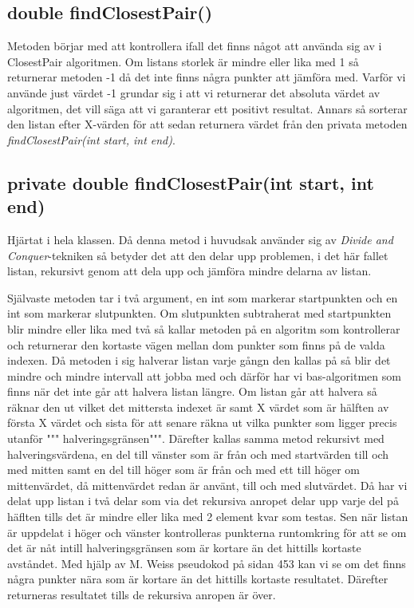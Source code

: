 \documentclass[a5paper,10pt,oneside]{article}
\begin{document}
\subsection{double findClosestPair()} 
Metoden börjar med att kontrollera ifall det finns något att använda sig av i ClosestPair algoritmen. Om listans storlek är mindre eller lika med 1 så returnerar metoden -1 då det inte finns några punkter att jämföra med. Varför vi använde just värdet -1 grundar sig i att vi returnerar det absoluta värdet av algoritmen, det vill säga att vi garanterar ett positivt resultat. Annars så sorterar den listan efter X-värden för att sedan returnera värdet från den privata metoden \textit{findClosestPair(int start, int end)}.

\subsection{private double findClosestPair(int start, int end)} 
Hjärtat i hela klassen.
Då denna metod i huvudsak använder sig av \textit{Divide and Conquer}-tekniken så betyder det att den delar upp problemen, i det här fallet listan, rekursivt genom att dela upp och jämföra mindre delarna av listan.

Självaste metoden tar i två argument, en int som markerar startpunkten och en int som markerar slutpunkten. Om slutpunkten subtraherat med startpunkten blir mindre eller lika med två så kallar metoden på en algoritm som kontrollerar och returnerar den kortaste vägen mellan dom punkter som finns på de valda indexen. Då metoden i sig halverar listan varje gångn den kallas på så blir det mindre och mindre intervall att jobba med och därför har vi bas-algoritmen som finns när det inte går att halvera listan längre. Om listan går att halvera så räknar den ut vilket det mittersta indexet är samt X värdet som är hälften av första X värdet och sista för att senare räkna ut vilka punkter som ligger precis utanför """ halveringsgränsen""". Därefter kallas samma metod rekursivt med halveringsvärdena, en del till vänster som är från och med startvärden till och med mitten samt en del till höger som är från och med ett till höger om mittenvärdet, då mittenvärdet redan är använt, till och med slutvärdet.
Då har vi delat upp listan i två delar som via det rekursiva anropet delar upp varje del på häflten tills det är mindre eller lika med 2 element kvar som testas. Sen när listan är uppdelat i höger och vänster kontrolleras punkterna runtomkring för att se om det är nåt intill halveringsgränsen som är kortare än det hittills kortaste avståndet. Med hjälp av M. Weiss pseudokod på sidan 453 kan vi se om det finns några punkter nära som är kortare än det hittills kortaste resultatet.
Därefter returneras resultatet tills de rekursiva anropen är över.
\end{document}
